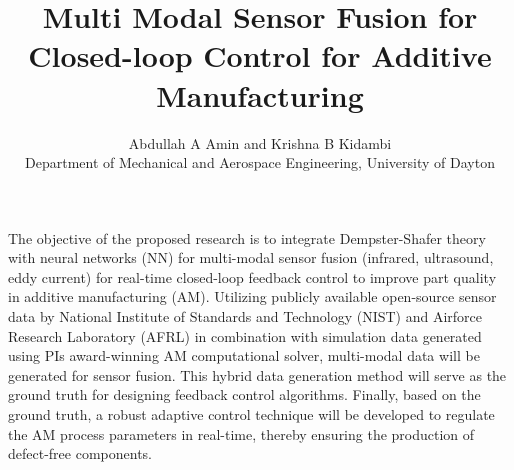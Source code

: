 \documentclass[12pt]{article}
\title{\vspace{-1.59cm}Multi Modal Sensor Fusion for Closed-loop Control for Additive Manufacturing \vspace{-2ex}}
\author{Abdullah A Amin and Krishna B Kidambi \protect\\ 
Department of Mechanical and Aerospace Engineering, University of Dayton \vspace{-2ex}}
\date{}
\begin{document}
\maketitle
{}
The objective of the proposed research is to integrate Dempster-Shafer theory with neural networks (NN) for multi-modal sensor fusion (infrared, ultrasound, eddy current) for real-time closed-loop feedback control to improve part quality in additive manufacturing (AM). Utilizing publicly available open-source sensor data by National Institute of Standards and Technology (NIST) and Airforce Research Laboratory (AFRL) in combination with simulation data generated using PIs award-winning AM computational solver, multi-modal data will be generated for sensor fusion. This hybrid data generation method will serve as the ground truth for designing feedback control algorithms. Finally, based on the ground truth, a robust adaptive control technique will be developed to regulate the AM process parameters in real-time, thereby ensuring the production of defect-free components.
\end{document}
